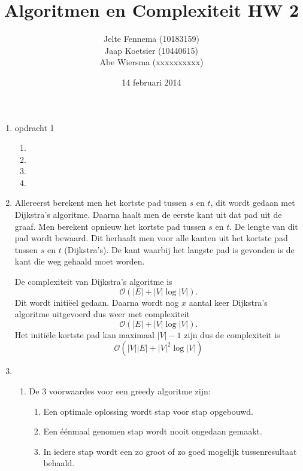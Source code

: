\documentclass[11pt]{article}
\title{\textbf{Algoritmen en Complexiteit HW 2}}
\author{Jelte Fennema (10183159)\\
		Jaap Koetsier (10440615)\\
        Abe Wiersma (xxxxxxxxxx)}
\date{14 februari 2014}
\newcommand{\bigO}{\ensuremath{\mathcal{O}}}
\begin{document}
\maketitle

\begin{enumerate}
    \item opdracht 1
        \begin{enumerate}
            \item
            \item
            \item
            \item
        \end{enumerate}
    \item
        Allereerst berekent men het kortste pad tussen $s$ en $t$, dit wordt
        gedaan met Dijkstra's algoritme. Daarna haalt men de eerste kant uit dat
        pad uit de graaf. Men berekent opnieuw het kortste pad tussen $s$ en
        $t$. De lengte van dit pad wordt bewaard. Dit herhaalt men voor alle
        kanten uit het kortste pad tussen $s$ en $t$ (Dijkstra's). De kant waarbij het
        langste pad is gevonden is de kant die weg gehaald moet worden.

        De complexiteit van Dijkstra's algoritme is $$\bigO(|E| + |V|\log|V|).$$
        Dit wordt initiëel gedaan. Daarna wordt nog $x$ aantal keer Dijkstra's
        algoritme uitgevoerd dus weer met complexiteit
        $$\bigO(|E| + |V|\log|V|).$$
        Het initiële kortste pad kan maximaal $|V|-1$ zijn dus de complexiteit
        is $$\bigO(|V||E| + |V|^2\log|V|)$$
    \item
        \begin{enumerate}
            \item
                De 3 voorwaardes voor een greedy algoritme zijn:

                \begin{enumerate}[\bfseries 1.]

                    \item Een optimale oplossing wordt stap voor stap opgebouwd.

                    \item Een éénmaal genomen stap wordt nooit ongedaan gemaakt.

                    \item In iedere stap wordt een zo groot of zo goed mogelijk
                        tussenresultaat behaald.

                \end{enumerate}


\end{enumerate}
\end{enumerate}
\end{document}
